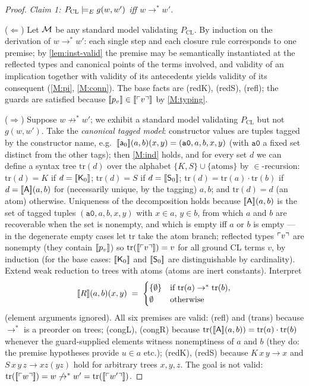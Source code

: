 \begin{proof}
\emph{Claim 1: $P_{\mathrm{CL}} \models_{E} g(w,w')$ iff
$w \to^{*} w'$.}

($\Leftarrow$)  Let $\mathcal{M}$ be any standard model validating
$P_{\mathrm{CL}}$.  By induction on the derivation of $w \to^{*}
w'$: each single step and each closure rule corresponds to one
premise; by \cref{lem:inst-valid} the premise may be semantically
instantiated at the reflected types and canonical points of the
terms involved, and validity of an implication together with
validity of its antecedents yields validity of its consequent
(\ref{M:pi}, \ref{M:conn}).  The base facts are (redK), (redS),
(refl); the guards are satisfied because $[\![ p_v ]\!] \in
[\![ \ulcorner v \urcorner ]\!]$ by \ref{M:typing}.

($\Rightarrow$)  Suppose $w \not\to^{*} w'$; we exhibit a standard
model validating $P_{\mathrm{CL}}$ but not $g(w,w')$.  Take the
\emph{canonical tagged model}: constructor values are tuples tagged
by the constructor name, e.g.\ $[\![ \mathsf{a}_0 ]\!](a, b)(x, y) =
(\texttt{a0}, a, b, x, y)$ (with $\texttt{a0}$ a fixed set distinct
from the other tags); then \ref{M:ind} holds, and for every set $d$
we can define a syntax tree $\mathrm{tr}(d)$ over the alphabet
$\{K, S\} \cup \{\text{atoms}\}$ by $\in$-recursion:
$\mathrm{tr}(d) = K$ if $d = [\![ \mathsf{K}_0 ]\!]$; $\mathrm{tr}(d) =
S$ if $d = [\![ \mathsf{S}_0 ]\!]$; $\mathrm{tr}(d) =
\mathrm{tr}(a)\cdot\mathrm{tr}(b)$ if $d = [\![ \mathsf{A} ]\!](a,b)$
for (necessarily unique, by the tagging) $a, b$; and
$\mathrm{tr}(d) = d$ (an atom) otherwise.  Uniqueness of the
decomposition holds because $[\![ \mathsf{A} ]\!](a,b)$ is the set of
tagged tuples $(\texttt{a0},a,b,x,y)$ with $x \in a$, $y \in b$,
from which $a$ and $b$ are recoverable when the set is nonempty, and
which is empty iff $a$ or $b$ is empty --- in the degenerate empty
cases let $\mathrm{tr}$ take the atom branch; reflected types
$\ulcorner v \urcorner$ are nonempty (they contain $[\![ p_v ]\!]$) so
$\mathrm{tr}([\![ \ulcorner v \urcorner ]\!]) = v$ for all ground CL terms $v$, by
induction (for the base cases: $[\![ \mathsf{K}_0 ]\!]$ and
$[\![ \mathsf{S}_0 ]\!]$ are distinguishable by cardinality).  Extend
weak reduction to trees with atoms (atoms are inert constants).
Interpret
\[
  [\![ R ]\!](a, b)(x, y) \;=\;
  \begin{cases}
    \{\emptyset\} & \text{if } \mathrm{tr}(a) \to^{*} \mathrm{tr}(b),\\
    \emptyset & \text{otherwise}
  \end{cases}
\]
(element arguments ignored).  All six premises are valid: (refl) and
(trans) because $\to^{*}$ is a preorder on trees; (congL), (congR)
because $\mathrm{tr}([\![ \mathsf{A} ]\!](a,b)) =
\mathrm{tr}(a)\cdot\mathrm{tr}(b)$ whenever the guard-supplied
elements witness nonemptiness of $a$ and $b$ (they do: the premise
hypotheses provide $u \in a$ etc.); (redK), (redS) because
$K\,x\,y \to x$ and $S\,x\,y\,z \to x z (y z)$ hold for arbitrary
trees $x, y, z$.  The goal is not valid:
$\mathrm{tr}([\![ \ulcorner w \urcorner ]\!]) = w \not\to^{*} w' =
\mathrm{tr}([\![ \ulcorner w' \urcorner ]\!])$.


\end{proof}
